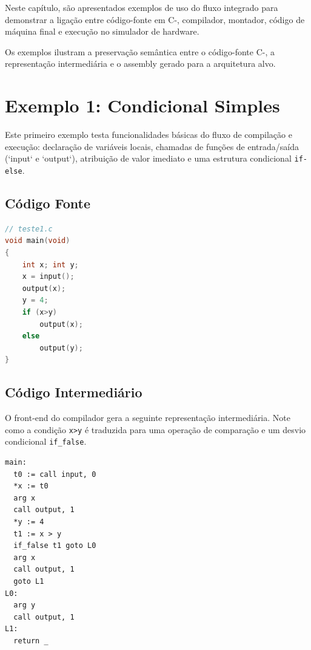 \documentclass[
	12pt,				%
	oneside,
	a4paper,			%
	english,			%
	french,				%
	spanish,			%
	brazil,				%
	]{abntex2}
\begin{document}
Neste capítulo, são apresentados exemplos de uso do fluxo integrado para demonstrar a ligação entre código-fonte em C-, compilador, montador, código de máquina final e execução no simulador de hardware.

Os exemplos ilustram a preservação semântica entre o código-fonte C-, a representação intermediária e o assembly gerado para a arquitetura alvo.

\section{Exemplo 1: Condicional Simples}
Este primeiro exemplo testa funcionalidades básicas do fluxo de compilação e execução: declaração de variáveis locais, chamadas de funções de entrada/saída (`input` e `output`), atribuição de valor imediato e uma estrutura condicional \texttt{if-else}.

\subsection{Código Fonte}
\begin{lstlisting}[language=C, caption={Código Fonte do Exemplo 1}]
// teste1.c
void main(void)
{
    int x; int y;
    x = input();
    output(x);
    y = 4;
    if (x>y)
        output(x);
    else
        output(y);
}
\end{lstlisting}

\subsection{Código Intermediário}
O front-end do compilador gera a seguinte representação intermediária. Note como a condição \texttt{x>y} é traduzida para uma operação de comparação e um desvio condicional \texttt{if\_false}.
\begin{lstlisting}[language=text, caption={Código Intermediário do Exemplo 1}]
main:
  t0 := call input, 0
  *x := t0
  arg x
  call output, 1
  *y := 4
  t1 := x > y
  if_false t1 goto L0
  arg x
  call output, 1
  goto L1
L0:
  arg y
  call output, 1
L1:
  return _
\end{lstlisting}
\end{document}
